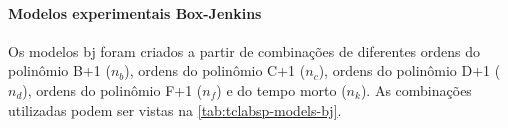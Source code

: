 \paragraph*{\textbf{Modelos experimentais Box-Jenkins}}
\label{par:modelos_experimentais_bj}

Os modelos \acrshort{bj} foram criados a partir de combinações de diferentes ordens do polinômio B+1 ($n_b$),
ordens do polinômio C+1 ($n_c$), ordens do polinômio D+1 ($n_d$), ordens do polinômio F+1 ($n_f$)
e do tempo morto ($n_k$). As combinações utilizadas podem ser vistas na
\cref{tab:tclabsp-models-bj}.

